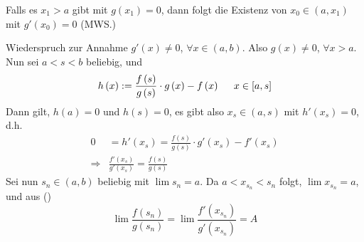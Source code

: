 \begin{beweis}{}
Falls es $x_1>a$ gibt mit $g\left( x_1\right)=0$, dann folgt die Existenz von $x_0\in\left( a,x_1\right)$ mit $g'\left( x_0\right)=0$ (MWS.)

\begin{center}
\end{center}

Wiederspruch zur Annahme $g'(x)\not=0$, $\forall x\in\left( a,b\right)$. Also $g(x)\not=0$, $\forall x>a$. Nun sei $a<s<b$ beliebig, und
\[h\left( x \right): = \frac{{f\left( s \right)}}{{g\left( s \right)}} \cdot g\left( x \right) - f\left( x \right)\hspace{5mm}x \in \left[ {a,s} \right]\]
Dann gilt, $h(a)=0$ und $h(s)=0$, es gibt also $x_s\in\left( a,s\right)$ mit $h'\left( x_s\right)=0$, d.h.
\begin{align*}
0 &= h'\left( {{x_s}} \right) = \frac{{f\left( s \right)}}{{g\left( s \right)}} \cdot g'\left( {{x_s}} \right) - f'\left( {{x_s}} \right)\\
 \Rightarrow& \frac{{f'\left( {{x_s}} \right)}}{{g'\left( {{x_s}} \right)}} = \frac{{f\left( s \right)}}{{g\left( s \right)}}\tag{\textasteriskcentered}
\end{align*}
Sei nun $s_n\in\left( a,b\right)$ beliebig mit $\lim s_n=a$. Da $a<x_{s_n}<s_n$ folgt, $\lim x_{s_n}=a$, und aus (\textasteriskcentered)
\[\lim \frac{{f\left( {{s_n}} \right)}}{{g\left( {{s_n}} \right)}} = \lim \frac{{f'\left( {{x_{{s_n}}}} \right)}}{{g'\left( {{x_{{s_n}}}} \right)}} = A\]
\end{beweis}

